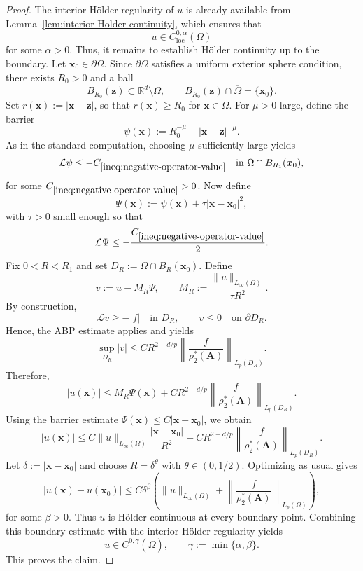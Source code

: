 \documentclass[final,onefignum,onetabnum]{mousaviart}
\begin{document}
	\begin{proof}
		The interior Hölder regularity of $u$ is already available from Lemma~\ref{lem:interior-Holder-continuity}, which ensures that
		\[
		u \in C^{0,\alpha}_{\mathrm{loc}}(\Omega)
		\]
		for some $\alpha>0$.
		Thus, it remains to establish Hölder continuity up to the boundary.
		Let $\boldsymbol{x}_0 \in \partial\Omega$. Since $\partial\Omega$ satisfies a uniform exterior sphere condition, there exists $R_0>0$ and a ball
		\[
		B_{R_0}(\boldsymbol{z}) \subset \mathbb{R}^d \setminus \Omega,
		\qquad
		\overline{B_{R_0}(\boldsymbol{z})}\cap \overline{\Omega}=\{\boldsymbol{x}_0\}.
		\]
		Set $r(\boldsymbol{x}) := |\boldsymbol{x}-\boldsymbol{z}|$, so that $r(\boldsymbol{x}) \ge R_0$ for $\boldsymbol{x}\in\Omega$.
		For $\mu>0$ large, define the barrier
		\begin{equation}
			\label{eq:barrier}
			\psi(\boldsymbol{x}) := R_0^{-\mu} - |\boldsymbol{x}-\boldsymbol{z}|^{-\mu}.
		\end{equation}
		As in the standard computation, choosing $\mu$ sufficiently large yields
		\begin{equation}
			\label{ineq:negative-operator-value}
			\mathcal{L} \psi \le - C_{\ref{ineq:negative-operator-value}} \quad \text{in } \Omega \cap B_{R_1}(\boldsymbol{x}_0),
		\end{equation}
		for some $C_{\ref{ineq:negative-operator-value}}>0$. 
		Now define
		\[
		\Psi(\boldsymbol{x}) := \psi(\boldsymbol{x}) + \tau |\boldsymbol{x}-\boldsymbol{x}_0|^2,
		\]
		with $\tau>0$ small enough so that
		\[
		\mathcal{L} \Psi \le -\frac{C_{\ref{ineq:negative-operator-value}}}{2}.
		\]
		Fix $0<R<R_1$ and set $D_R := \Omega \cap B_R(\boldsymbol{x}_0)$. Define
		\[
		v := u - M_R \Psi,
		\qquad
		M_R := \frac{\|u\|_{L_\infty(\Omega)}}{\tau R^2}.
		\]
		By construction,
		\[
		\mathcal{L} v \ge -|f| \quad \text{in } D_R,
		\qquad
		v \le 0 \quad \text{on } \partial D_R.
		\]
		Hence, the ABP estimate applies and yields
		\[
		\sup_{D_R} |v|
		\le
		C R^{2-d/p}
		\left\|\frac{f}{\rho_2^{\ast}(\boldsymbol{A})}\right\|_{L_p(D_R)}.
		\]
		Therefore,
		\[
		|u(\boldsymbol{x})|
		\le
		M_R \Psi(\boldsymbol{x})
		+
		C R^{2-d/p}
		\left\|\frac{f}{\rho_2^{\ast}(\boldsymbol{A})}\right\|_{L_p(D_R)}.
		\]
		Using the barrier estimate $\Psi(\boldsymbol{x}) \le C|\boldsymbol{x}-\boldsymbol{x}_0|$, we obtain
		\[
		|u(\boldsymbol{x})|
		\le
		C\|u\|_{L_\infty(\Omega)} \frac{|\boldsymbol{x}-\boldsymbol{x}_0|}{R^2}
		+
		C R^{2-d/p}
		\left\|\frac{f}{\rho_2^{\ast}(\boldsymbol{A})}\right\|_{L_p(D_R)}.
		\]
		Let $\delta := |\boldsymbol{x}-\boldsymbol{x}_0|$ and choose $R=\delta^\theta$ with $\theta \in (0,1/2)$. Optimizing as usual gives
		\[
		|u(\boldsymbol{x})-u(\boldsymbol{x}_0)|
		\le
		C \delta^\beta
		\left(
		\|u\|_{L_\infty(\Omega)}
		+
		\left\|\frac{f}{\rho_2^{\ast}(\boldsymbol{A})}\right\|_{L_p(\Omega)}
		\right),
		\]
		for some $\beta>0$. Thus $u$ is Hölder continuous at every boundary point. Combining this boundary estimate with the interior Hölder regularity yields
		\[
		u \in C^{0,\gamma}(\overline{\Omega}),
		\qquad
		\gamma := \min\{\alpha,\beta\}.
		\]
		This proves the claim.
	\end{proof}
	
\end{document}
